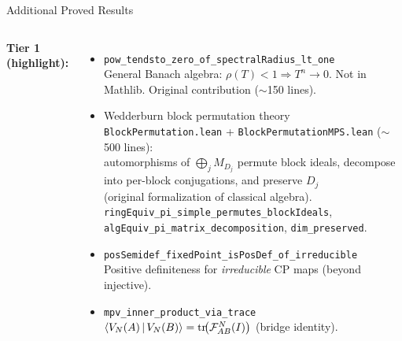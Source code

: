 \documentclass[aspectratio=169,10pt]{beamer}
\begin{document}
\begin{frame}{Additional Proved Results}
    \vspace{-0.8em}

    \begin{columns}[T]
        \textbf{\textcolor{amber}{Tier 1 (highlight):}}
        \begin{itemize}\itemsep0.12em\scriptsize
            \item[\textcolor{leangreen}{\checkmark}] \texttt{pow\_tendsto\_zero\_of\_spectralRadius\_lt\_one}\\
                {\tiny General Banach algebra: $\rho(T)<1 \Rightarrow T^n \to 0$.\; \textcolor{amber}{Not in Mathlib}.\; Original contribution (${\sim}$150 lines).}
            \item[\textcolor{leangreen}{\checkmark}] Wedderburn block permutation theory\\
                {\tiny \texttt{BlockPermutation.lean} + \texttt{BlockPermutationMPS.lean} (${\sim}$500 lines):\\
                automorphisms of $\bigoplus_j M_{D_j}$ permute block ideals, decompose into per-block conjugations, and preserve $D_j$\\
                (original formalization of classical algebra).\\
                \texttt{ringEquiv\_pi\_simple\_permutes\_blockIdeals},\\
                \texttt{algEquiv\_pi\_matrix\_decomposition}, \texttt{dim\_preserved}.}
            \item[\textcolor{leangreen}{\checkmark}] \texttt{posSemidef\_fixedPoint\_isPosDef\_of\_irreducible}\\
                {\tiny Positive definiteness for \emph{irreducible} CP maps (beyond injective).}
            \item[\textcolor{leangreen}{\checkmark}] \texttt{mpv\_inner\_product\_via\_trace}\\
                {\tiny $\langle V_N(A)\,|\,V_N(B)\rangle = \mathrm{tr}\!\bigl(\mathcal{F}_{AB}^N(I)\bigr)$ (bridge identity).}
        \end{itemize}


\end{columns}
\end{frame}
\end{document}
